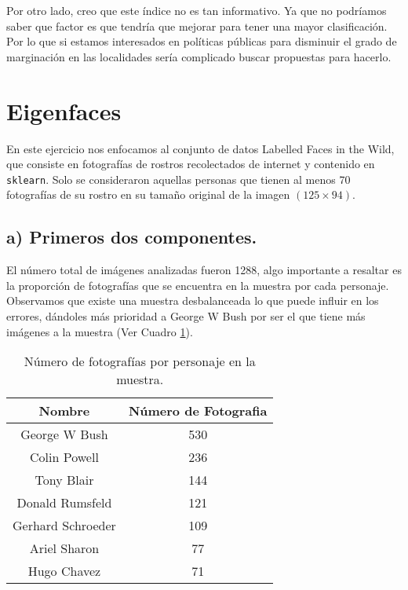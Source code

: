 \documentclass[paper=letter, fontsize=11pt]{scrartcl}
\numberwithin{equation}{section} %
\numberwithin{figure}{section} %
\numberwithin{table}{section} %
\begin{document}
Por otro lado, creo que este índice no es tan informativo. Ya que no podríamos saber que factor es que tendría que mejorar para tener una mayor clasificación. Por lo que si estamos interesados en políticas públicas para disminuir el grado de marginación en las localidades sería complicado buscar propuestas para hacerlo.

\section{Eigenfaces}
En este ejercicio nos enfocamos al conjunto de datos Labelled Faces in the Wild, que consiste en fotografías de rostros recolectados de internet y contenido en \texttt{sklearn}. Solo se consideraron aquellas personas que tienen al menos 70 fotografías de su rostro en su tamaño original de la imagen $(125 \times 94)$. 

\subsection{a) Primeros dos componentes.}
El número total de imágenes analizadas fueron 1288, algo importante a resaltar es la proporción de fotografías que se encuentra en la muestra por cada personaje. Observamos que existe una muestra desbalanceada lo que puede influir en los errores, dándoles más prioridad a George W Bush por ser el que tiene más imágenes a la muestra (Ver Cuadro \ref{tab:conteo_imagenes}).

\begin{table}[H]
    \centering
    \begin{tabular}{c|c}
         Nombre& Número de Fotografia \\ \hline \hline
         George W Bush  &  530\\
Colin Powell    & 236\\
Tony Blair      & 144\\
Donald Rumsfeld & 121\\
Gerhard Schroeder  & 109\\
Ariel Sharon    &77\\
Hugo Chavez     &71\\ \hline \hline
    \end{tabular}
    \caption{Número de fotografías por personaje en la muestra.}
    \label{tab:conteo_imagenes}
\end{table}
\end{document}
